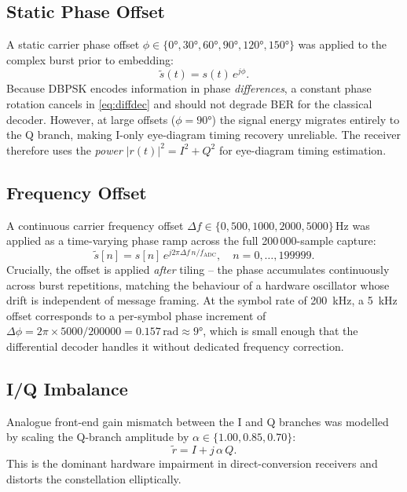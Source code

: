 \documentclass[journal]{IEEEtran}
\begin{document}
\subsection{Static Phase Offset}

A static carrier phase offset $\phi \in \{0°, 30°, 60°, 90°, 120°, 150°\}$ was
applied to the complex burst prior to embedding:
\begin{equation}
  \tilde{s}(t) = s(t)\,e^{j\phi}.
\end{equation}
Because DBPSK encodes information in phase \emph{differences}, a constant phase
rotation cancels in \eqref{eq:diffdec} and should not degrade BER for the classical
decoder. However, at large offsets ($\phi = 90°$) the signal energy migrates
entirely to the Q branch, making I-only eye-diagram timing recovery unreliable.
The receiver therefore uses the \emph{power} $|r(t)|^2 = I^2+Q^2$ for eye-diagram
timing estimation.

\subsection{Frequency Offset}

A continuous carrier frequency offset $\Delta f \in \{0, 500, 1000, 2000, 5000\}\,\si{\hertz}$
was applied as a time-varying phase ramp across the full 200\,000-sample capture:
\begin{equation}
  \tilde{s}[n] = s[n]\,e^{j2\pi \Delta f\, n / f_\text{ADC}},
  \quad n = 0,\ldots,199999.
\end{equation}
Crucially, the offset is applied \emph{after} tiling -- the phase accumulates
continuously across burst repetitions, matching the behaviour of a hardware
oscillator whose drift is independent of message framing. At the symbol rate of
\SI{200}{\kilo\hertz}, a \SI{5}{\kilo\hertz} offset corresponds to a per-symbol
phase increment of $\Delta\phi = 2\pi \times 5000/200000 = 0.157\,\si{\radian}
\approx 9°$, which is small enough that the differential decoder handles it
without dedicated frequency correction.

\subsection{I/Q Imbalance}

Analogue front-end gain mismatch between the I and Q branches was modelled by
scaling the Q-branch amplitude by $\alpha \in \{1.00, 0.85, 0.70\}$:
\begin{equation}
  \tilde{r} = I + j\,\alpha\, Q.
\end{equation}
This is the dominant hardware impairment in direct-conversion receivers
\cite{proakis2008digital} and distorts the constellation elliptically.
\end{document}
